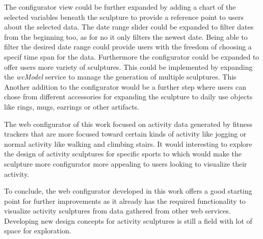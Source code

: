 \documentclass[../medieninformatik-arbeit.tex]{subfiles}
\begin{document}
The configurator view could be further expanded by adding a chart of the selected variables beneath the sculpture to provide a reference point to users about the selected data. The date range slider could be expanded to filter dates from the beginning too, as for no it only filters the newest date. Being able to filter the desired date range could provide users with the freedom of choosing a specif time span for the data. Furthermore the configurator could be expanded to offer users more variety of sculptures. This could be implemented by expanding the \textit{wcModel} service to manage the generation of multiple sculptures. This Another addition to the configurator would be a further step where users can chose from different accessories for expanding the sculpture to daily use objects like rings, mugs, earrings or other artifacts. 

The web configurator of this work focused on activity data generated by fitness trackers that are more focused toward certain kinds of activity like jogging or normal activity like walking and climbing stairs. It would interesting to explore the design of activity sculptures for specific sports to which would make the sculpture more configurator more appealing to users looking to visualize their activity.

To conclude, the web configurator developed in this work offers a good starting point for further improvements as it already has the required functionality to visualize activity sculptures from data gathered from other web services. Developing new design concepts for activity sculptures is still a field with lot of space for exploration.
\end{document}
